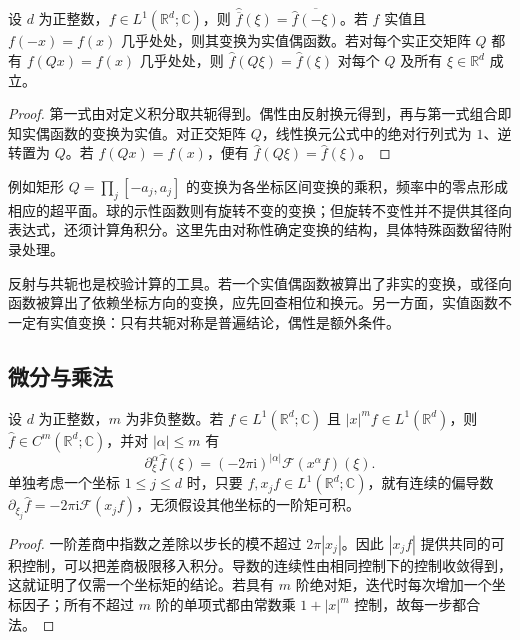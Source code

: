 \begin{proposition}\label{b2:prop:03-symmetries}
设 \(d\) 为正整数，\(f\in L^1(\mathbb R^d;\mathbb C)\)，则 \(\widehat{\overline f}(\xi)=\overline{\widehat f(-\xi)}\)。若 \(f\) 实值且 \(f(-x)=f(x)\) 几乎处处，则其变换为实值偶函数。若对每个实正交矩阵 \(Q\) 都有 \(f(Qx)=f(x)\) 几乎处处，则 \(\widehat f(Q\xi)=\widehat f(\xi)\) 对每个 \(Q\) 及所有 \(\xi\in\mathbb R^d\) 成立。
\end{proposition}
\begin{proof}
第一式由对定义积分取共轭得到。偶性由反射换元得到，再与第一式组合即知实偶函数的变换为实值。对正交矩阵 \(Q\)，线性换元公式中的绝对行列式为 \(1\)、逆转置为 \(Q\)。若 \(f(Qx)=f(x)\)，便有 \(\widehat f(Q\xi)=\widehat f(\xi)\)。
\end{proof}

例如矩形 \(Q=\prod_j[-a_j,a_j]\) 的变换为各坐标区间变换的乘积，频率中的零点形成相应的超平面。球的示性函数则有旋转不变的变换；但旋转不变性并不提供其径向表达式，还须计算角积分。这里先由对称性确定变换的结构，具体特殊函数留待附录处理。

\ProseParagraphBreak

反射与共轭也是校验计算的工具。若一个实值偶函数被算出了非实的变换，或径向函数被算出了依赖坐标方向的变换，应先回查相位和换元。另一方面，实值函数不一定有实值变换：只有共轭对称是普遍结论，偶性是额外条件。

\subsection{微分与乘法}
\label{b2:subsec:030105}

\begin{proposition}\label{b2:prop:03-moments}
设 \(d\) 为正整数，\(m\) 为非负整数。若 \(f\in L^1(\mathbb R^d;\mathbb C)\) 且 \(|x|^m f\in L^1(\mathbb R^d)\)，则 \(\widehat f\in C^m(\mathbb R^d;\mathbb C)\)，并对 \(|\alpha|\leq m\) 有
\[
 \partial_\xi^\alpha\widehat f(\xi)
 =(-2\pi\mathrm{i})^{|\alpha|}\mathcal F(x^\alpha f)(\xi).
\]
单独考虑一个坐标 \(1\leq j\leq d\) 时，只要 \(f,x_jf\in L^1(\mathbb R^d;\mathbb C)\)，就有连续的偏导数 \(\partial_{\xi_j}\widehat f=-2\pi\mathrm{i}\mathcal F(x_jf)\)，无须假设其他坐标的一阶矩可积。
\end{proposition}
\begin{proof}
一阶差商中指数之差除以步长的模不超过 \(2\pi|x_j|\)。因此 \(|x_jf|\) 提供共同的可积控制，可以把差商极限移入积分。导数的连续性由相同控制下的控制收敛得到，这就证明了仅需一个坐标矩的结论。若具有 \(m\) 阶绝对矩，迭代时每次增加一个坐标因子；所有不超过 \(m\) 阶的单项式都由常数乘 \(1+|x|^m\) 控制，故每一步都合法。
\end{proof}

